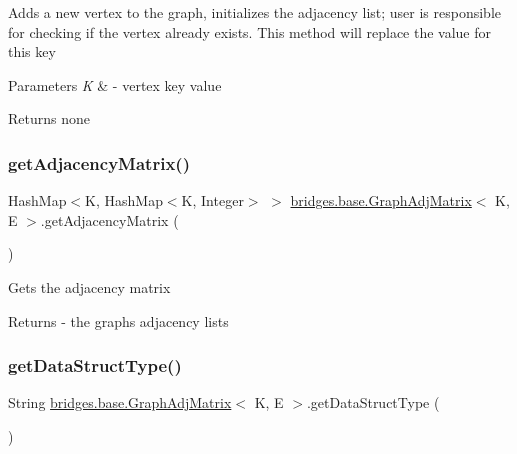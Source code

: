 Adds a new vertex to the graph, initializes the adjacency list; user is responsible for checking if the vertex already exists. This method will replace the value for this key


\begin{DoxyParams}{Parameters}
{\em K} & -\/ vertex key value \\
\hline
\end{DoxyParams}
\begin{DoxyReturn}{Returns}
none 
\end{DoxyReturn}
\hypertarget{classbridges_1_1base_1_1_graph_adj_matrix_a2bf0bf69333497b3b97788b74fe1f5b7}{}\label{classbridges_1_1base_1_1_graph_adj_matrix_a2bf0bf69333497b3b97788b74fe1f5b7} 
\subsubsection{\texorpdfstring{get\+Adjacency\+Matrix()}{getAdjacencyMatrix()}}
{\footnotesize\ttfamily Hash\+Map$<$K, Hash\+Map$<$K, Integer$>$ $>$ \hyperlink{classbridges_1_1base_1_1_graph_adj_matrix}{bridges.\+base.\+Graph\+Adj\+Matrix}$<$ K, E $>$.get\+Adjacency\+Matrix (\begin{DoxyParamCaption}{ }\end{DoxyParamCaption})}

Gets the adjacency matrix

\begin{DoxyReturn}{Returns}
-\/ the graph\textquotesingle{}s adjacency lists 
\end{DoxyReturn}
\hypertarget{classbridges_1_1base_1_1_graph_adj_matrix_aa837a6bd0afbc700bf6277a062c5fdae}{}\label{classbridges_1_1base_1_1_graph_adj_matrix_aa837a6bd0afbc700bf6277a062c5fdae} 
\subsubsection{\texorpdfstring{get\+Data\+Struct\+Type()}{getDataStructType()}}
{\footnotesize\ttfamily String \hyperlink{classbridges_1_1base_1_1_graph_adj_matrix}{bridges.\+base.\+Graph\+Adj\+Matrix}$<$ K, E $>$.get\+Data\+Struct\+Type (\begin{DoxyParamCaption}{ }\end{DoxyParamCaption})}

